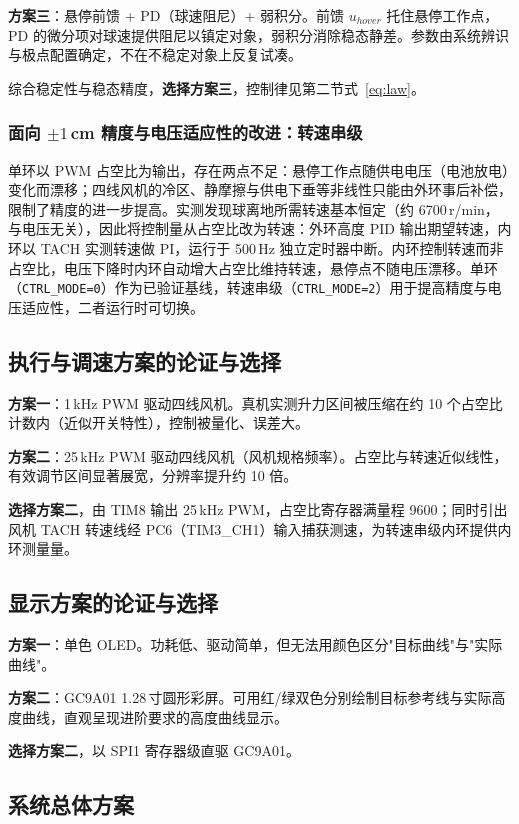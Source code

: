 \documentclass[12pt,a4paper]{ctexart}
\begin{document}
\textbf{方案三}：悬停前馈 + PD（球速阻尼）+ 弱积分。前馈 $u_{hover}$ 托住悬停工作点，PD 的微分项对球速提供阻尼以镇定对象，弱积分消除稳态静差。参数由系统辨识与极点配置确定，不在不稳定对象上反复试凑。

综合稳定性与稳态精度，\textbf{选择方案三}，控制律见第二节式~\eqref{eq:law}。

\subsubsection{面向 $\pm1$\,cm 精度与电压适应性的改进：转速串级}
单环以 PWM 占空比为输出，存在两点不足：悬停工作点随供电电压（电池放电）变化而漂移；四线风机的冷区、静摩擦与供电下垂等非线性只能由外环事后补偿，限制了精度的进一步提高。实测发现球离地所需转速基本恒定（约 6700\,r/min，与电压无关），因此将控制量从占空比改为转速：外环高度 PID 输出期望转速，内环以 TACH 实测转速做 PI，运行于 500\,Hz 独立定时器中断。内环控制转速而非占空比，电压下降时内环自动增大占空比维持转速，悬停点不随电压漂移。单环（\texttt{CTRL\_MODE=0}）作为已验证基线，转速串级（\texttt{CTRL\_MODE=2}）用于提高精度与电压适应性，二者运行时可切换。

\subsection{执行与调速方案的论证与选择}

\textbf{方案一}：1\,kHz PWM 驱动四线风机。真机实测升力区间被压缩在约 10 个占空比计数内（近似开关特性），控制被量化、误差大。

\textbf{方案二}：25\,kHz PWM 驱动四线风机（风机规格频率）。占空比与转速近似线性，有效调节区间显著展宽，分辨率提升约 10 倍。

\textbf{选择方案二}，由 TIM8 输出 25\,kHz PWM，占空比寄存器满量程 9600；同时引出风机 TACH 转速线经 PC6（TIM3\_CH1）输入捕获测速，为转速串级内环提供内环测量量。

\subsection{显示方案的论证与选择}

\textbf{方案一}：单色 OLED。功耗低、驱动简单，但无法用颜色区分"目标曲线"与"实际曲线"。

\textbf{方案二}：GC9A01 1.28\,寸圆形彩屏。可用红/绿双色分别绘制目标参考线与实际高度曲线，直观呈现进阶要求的高度曲线显示。

\textbf{选择方案二}，以 SPI1 寄存器级直驱 GC9A01。

\subsection{系统总体方案}
\end{document}
